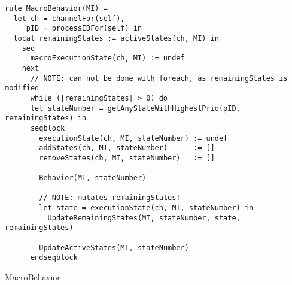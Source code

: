 \begin{listing}[H]
\begin{verbatim}
rule MacroBehavior(MI) =
  let ch = channelFor(self),
     pID = processIDFor(self) in
  local remainingStates := activeStates(ch, MI) in
    seq
      macroExecutionState(ch, MI) := undef
    next
      // NOTE: can not be done with foreach, as remainingStates is modified
      while (|remainingStates| > 0) do
      let stateNumber = getAnyStateWithHighestPrio(pID, remainingStates) in
      seqblock
        executionState(ch, MI, stateNumber) := undef
        addStates(ch, MI, stateNumber)      := []
        removeStates(ch, MI, stateNumber)   := []

        Behavior(MI, stateNumber)

        // NOTE: mutates remainingStates!
        let state = executionState(ch, MI, stateNumber) in
          UpdateRemainingStates(MI, stateNumber, state, remainingStates)

        UpdateActiveStates(MI, stateNumber)
      endseqblock
\end{verbatim}
\caption{MacroBehavior}
\label{lst:asm:MacroBehavior}
\end{listing}




